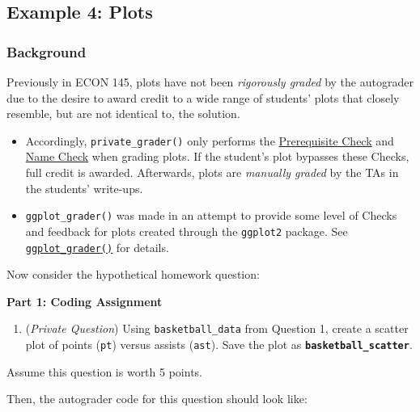 \documentclass[
  12pt,
]{book}
\providecommand{\tightlist}{%
  \setlength{\itemsep}{0pt}\setlength{\parskip}{0pt}}
\begin{document}
\subsection*{Example 4: Plots}\label{private_grader-plots}

\subsubsection*{Background}\label{background}

Previously in ECON 145, plots have not been \emph{rigorously graded} by the autograder due to the desire to award credit to a wide range of students' plots that closely resemble, but are not identical to, the solution.

\begin{itemize}
\item
  Accordingly, \texttt{private\_grader()} only performs the \hyperref[Prerequisite-Check]{Prerequisite Check} and \hyperref[Name-Check]{Name Check} when grading plots. If the student's plot bypasses these Checks, full credit is awarded. Afterwards, plots are \emph{manually graded} by the TAs in the students' write-ups.
\item
  \texttt{ggplot\_grader()} was made in an attempt to provide some level of Checks and feedback for plots created through the \texttt{ggplot2} package. See \hyperref[ggplot_grader]{\texttt{ggplot\_grader()}} for details.
\end{itemize}

Now consider the hypothetical homework question:

\textbf{Part 1: Coding Assignment}

\begin{enumerate}
\def\labelenumi{\arabic{enumi}.}
\setcounter{enumi}{1}
\tightlist
\item
  (\emph{Private Question}) Using \texttt{basketball\_data} from Question 1, create a scatter plot of points (\texttt{pt}) versus assists (\texttt{ast}). Save the plot as \textbf{\texttt{basketball\_scatter}}.
\end{enumerate}

Assume this question is worth 5 points.

Then, the autograder code for this question should look like:
\end{document}
